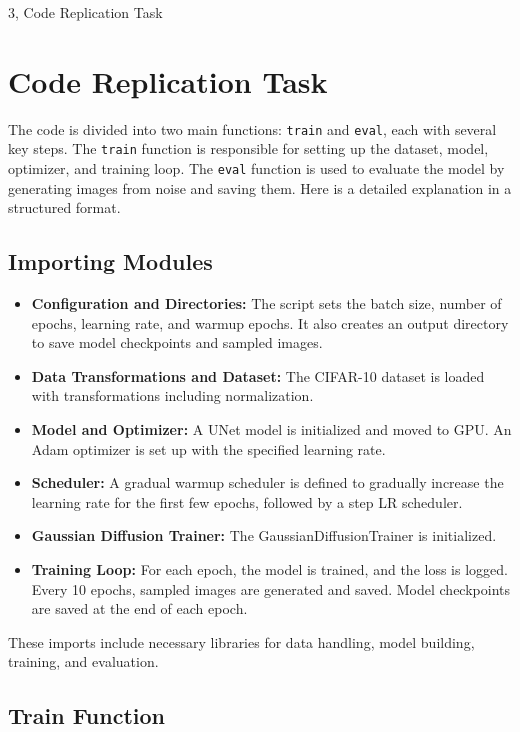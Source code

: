 \documentclass[10pt,a4paper]{article}
\begin{document}
\newpage
\begin{task}{3, Code Replication Task}
\section{Code Replication Task}
The code is divided into two main functions: \texttt{train} and \texttt{eval}, each with several key steps. The \texttt{train} function is responsible for setting up the dataset, model, optimizer, and training loop. The \texttt{eval} function is used to evaluate the model by generating images from noise and saving them. Here is a detailed explanation in a structured format.

\subsection{Importing Modules}

\begin{itemize}
    \item \textbf{Configuration and Directories:} The script sets the batch size, number of epochs, learning rate, and warmup epochs. It also creates an output directory to save model checkpoints and sampled images.
    \item \textbf{Data Transformations and Dataset: } The CIFAR-10 dataset is loaded with transformations including normalization.
    \item \textbf{Model and Optimizer:} A UNet model is initialized and moved to GPU. An Adam optimizer is set up with the specified learning rate.
    \item \textbf{Scheduler:} A gradual warmup scheduler is defined to gradually increase the learning rate for the first few epochs, followed by a step LR scheduler.
    \item \textbf{Gaussian Diffusion Trainer:} The GaussianDiffusionTrainer is initialized.
    \item \textbf{Training Loop:} For each epoch, the model is trained, and the loss is logged. Every 10 epochs, sampled images are generated and saved. Model checkpoints are saved at the end of each epoch.
\end{itemize} 

These imports include necessary libraries for data handling, model building, training, and evaluation.

\subsection{Train Function}


\end{task}
\end{document}
